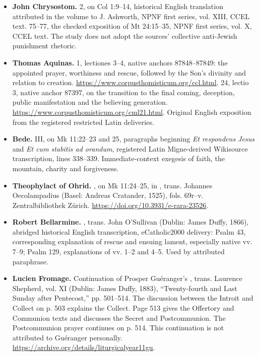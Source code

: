 \begin{itemize}
\item \textbf{John Chrysostom.}
 2, on Col 1:9--14,
historical English translation attributed in the volume
to J. Ashworth, NPNF first series, vol. XIII,
CCEL text.  75--77,
the checked exposition of Mt 24:15--35, NPNF first
series, vol. X, CCEL text. The study does not adopt
the sources' collective anti-Jewish punishment rhetoric.

\item \textbf{Thomas Aquinas.}
 1, lectiones 3--4,
native anchors 87848--87849: the appointed prayer,
worthiness and rescue, followed by the Son's
divinity and relation to creation.
\url{https://www.corpusthomisticum.org/ccl.html}.
 24, lectio 3,
native anchor 87397, on the transition to the
final coming, deception, public manifestation
and the believing generation.
\url{https://www.corpusthomisticum.org/cml21.html}.
Original English exposition from the registered
restricted Latin deliveries.

\item \textbf{Bede.}
 III,
on Mk 11:22--23 and 25, paragraphs beginning
\textit{Et respondens Jesus} and
\textit{Et cum stabitis ad orandum},
registered Latin Migne-derived Wikisource
transcription, lines 338--339. Immediate-context exegesis
of faith, the mountain, charity and forgiveness.

\item \textbf{Theophylact of Ohrid.}
, on Mk 11:24--25, in
, trans. Johannes
Oecolampadius (Basel: Andreas Cratander, 1525),
fols. 69r--v. Zentralbibliothek Zürich.
\url{https://doi.org/10.3931/e-rara-23526}.

\item \textbf{Robert Bellarmine.}
,
trans. John O'Sullivan (Dublin: James Duffy,
1866), abridged historical English transcription,
eCatholic2000 delivery: Psalm 43, corresponding
explanation of rescue and ensuing lament,
especially native vv. 7--9; Psalm 129,
explanations of vv. 1--2 and 4--5.
Used by attributed paraphrase.

\item \textbf{Lucien Fromage.}
Continuation of Prosper Guéranger's
, trans.
Laurence Shepherd, vol. XI (Dublin:
James Duffy, 1883), ``Twenty-fourth
and Last Sunday after Pentecost,''
pp. 501--514. The discussion between the Introit and Collect
on p. 503 explains the Collect. Page 513 gives the Offertory
and Communion texts and discusses the Secret and Postcommunion.
The Postcommunion prayer continues on p. 514.
This continuation is not attributed
to Guéranger personally.
\url{https://archive.org/details/liturgicalyear11gu}.


\end{itemize}
